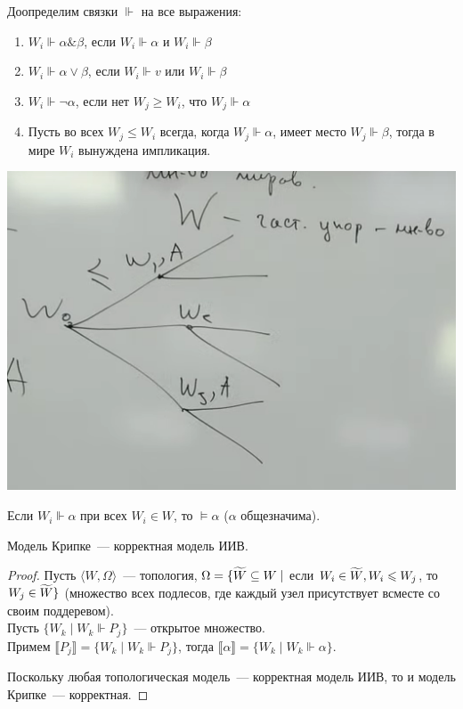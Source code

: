\begin{definition}
Доопределим связки  $\Vdash$ на все выражения:
\begin{enumerate}
    \item $W_i \Vdash \alpha\& \beta$, если $W_i \Vdash \alpha$ и $W_i \Vdash \beta$
    \item $W_i \Vdash \alpha\lor \beta$, если $W_i \Vdash v$ или $W_i \Vdash \beta$
    \item $W_i \Vdash \neg \alpha$, если нет $W_j \geqslant W_i$, что $W_j \Vdash \alpha$
    \item Пусть во всех $W_j \leqslant W_i$ всегда, когда $W_j \Vdash \alpha$, имеет место $W_j \Vdash \beta$, тогда в мире $W_i$ вынуждена импликация.
\end{enumerate}
\end{definition}

\includegraphics[scale=0.7]{img/forced_variable_worlds}

\begin{definition}
    Если $W_i \Vdash \alpha$ при всех $W_i \in W$, то $\vDash \alpha$ ($\alpha$ общезначима).
\end{definition}


\begin{theorem}
    Модель Крипке~--- корректная модель ИИВ.
\end{theorem}
\begin{proof}
    Пусть $\langle W, \Omega\rangle$~--- топология, $\Omega = \{\widetilde{W} \subseteq W \mid$ если  $ W_i\in \widetilde{W}, W_i \leqslant W_j$, то $W_j \in \widetilde{W} \}$ (множество всех подлесов, где каждый узел присутствует всместе со своим поддеревом).\\
    Пусть $\{W_k \mid W_k \Vdash P_j\}$~--- открытое множество.\\
    Примем $\llbracket P_j \rrbracket = \{ W_k \mid W_k \Vdash P_j\}$, тогда $\llbracket \alpha \rrbracket = \{ W_k \mid W_k \Vdash \alpha\}$.

    Поскольку любая топологическая модель~--- корректная модель ИИВ, то и модель Крипке~--- корректная.
\end{proof}

